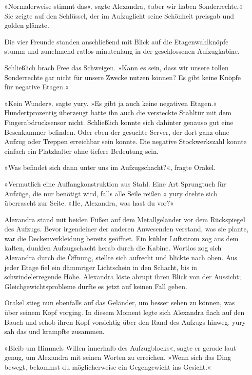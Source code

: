 »Normalerweise stimmt das«, sagte Alexandra, »aber wir haben Sonderrechte.« Sie zeigte auf den Schlüssel, der im Aufzuglicht seine Schönheit preisgab und golden glänzte.

Die vier Freunde standen anschließend mit Blick auf die Etagenwahlknöpfe stumm und zunehmend ratlos minutenlang in der geschlossenen Aufzugkabine.

Schließlich brach Free das Schweigen. »Kann es sein, dass wir unsere tollen Sonderrechte gar nicht für unsere Zwecke nutzen können? Es gibt keine Knöpfe für negative Etagen.«

»Kein Wunder«, sagte yury. »Es gibt ja auch keine negativen Etagen.« Hundertprozentig überzeugt hatte ihn auch die versteckte Stahltür mit dem Fingerabdrucksensor nicht. Schließlich konnte sich dahinter genauso gut eine Besenkammer befinden. Oder eben der gesuchte Server, der dort ganz ohne Aufzug oder Treppen erreichbar sein konnte. Die negative Stockwerkszahl konnte einfach ein Platzhalter ohne tiefere Bedeutung sein.

»Was befindet sich dann unter uns im Aufzugschacht?«, fragte Orakel.

»Vermutlich eine Auffangkonstruktion aus Stahl. Eine Art Sprungtuch für Aufzüge, die nur benötigt wird, falls alle Seile reißen.« yury drehte sich überrascht zur Seite. »He, Alexandra, was hast du vor?«

Alexandra stand mit beiden Füßen auf dem Metallgeländer vor dem Rückspiegel des Aufzugs. Bevor irgendeiner der anderen Anwesenden verstand, was sie plante, war die Deckenverkleidung bereits geöffnet. Ein kühler Luftstrom zog aus dem kalten, dunklen Aufzugschacht herab durch die Kabine. Wortlos zog sich Alexandra durch die Öffnung, stellte sich aufrecht und blickte nach oben. Aus jeder Etage fiel ein dämmriger Lichtschein in den Schacht, bis in schwindelerregende Höhe. Alexandra löste abrupt ihren Blick von der Aussicht; Gleichgewichtsprobleme durfte es jetzt auf keinen Fall geben.

Orakel stieg nun ebenfalls auf das Geländer, um besser sehen zu können, was über seinem Kopf vorging. In diesem Moment legte sich Alexandra flach auf den Bauch und schob ihren Kopf vorsichtig über den Rand des Aufzugs hinweg. yury sah das und krampfte zusammen.

»Bleib um Himmels Willen innerhalb des Aufzugblocks«, sagte er gerade laut genug, um Alexandra mit seinen Worten zu erreichen. »Wenn sich das Ding bewegt, bekommst du möglicherweise ein Gegengewicht ins Gesicht.«

